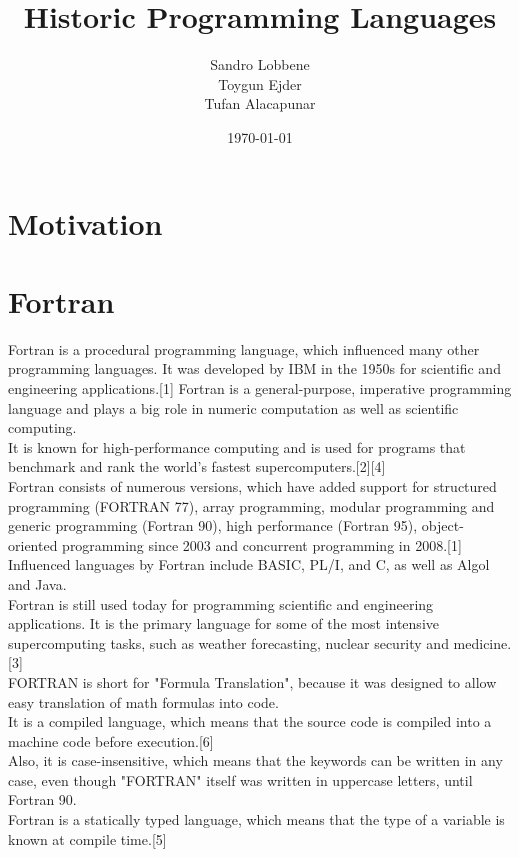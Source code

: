 \documentclass[11pt,a4paper]{scrartcl}
\title{Historic Programming Languages}
\author{Sandro Lobbene\\Toygun Ejder\\Tufan Alacapunar}
\date{\today}
\begin{document}
\begin{center}
\maketitle

\section{Motivation}

\section{Fortran}
\begin{spacing}{1.3}
Fortran is a procedural programming language, which influenced many other programming languages. It was developed by IBM in the 1950s for scientific and engineering applications.[1] Fortran is a general-purpose, imperative programming language and plays a big role in numeric computation as well as scientific computing.\\
It is known for high-performance computing and is used for programs that benchmark and rank the world's fastest supercomputers.[2][4]\\
Fortran consists of numerous versions, which have added support for structured programming (FORTRAN 77), array programming, modular programming and generic programming (Fortran 90), high performance (Fortran 95), object-oriented programming since 2003 and concurrent programming in 2008.[1] Influenced languages by Fortran include BASIC, PL/I, and C, as well as Algol and Java.\\
Fortran is still used today for programming scientific and engineering applications. It is the primary language for some of the most intensive supercomputing tasks, such as weather forecasting, nuclear security and medicine. [3]\\
FORTRAN is short for "Formula Translation", because it was designed to allow easy translation of math formulas into code.\\
It is a compiled language, which means that the source code is compiled into a machine code before execution.[6]\\
Also, it is case-insensitive, which means that the keywords can be written in any case, even though "FORTRAN" itself was written in uppercase letters, until Fortran 90.\\
Fortran is a statically typed language, which means that the type of a variable is known at compile time.[5]\\
\end{spacing}

\end{center}
\end{document}
